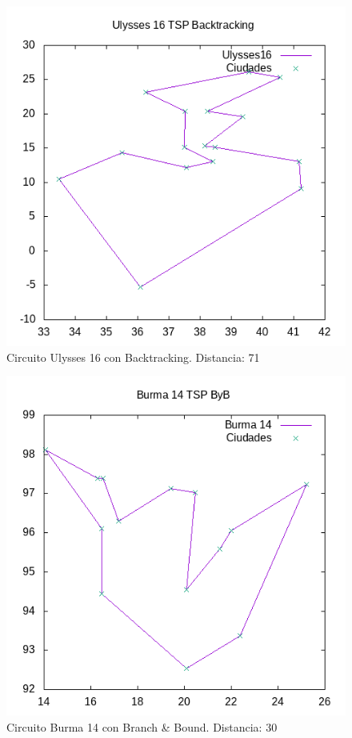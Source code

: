\documentclass{article}
\begin{document}
	\begin{figure}[H]
		\centering
		\includegraphics[totalheight=6cm]{ulysses16back}
		\caption{Circuito Ulysses 16 con Backtracking. Distancia: 71}
		\label{fig:u16back}
	\end{figure}

	\begin{figure}[H]
		\centering
		\includegraphics[totalheight=6cm]{burma14byb}
		\caption{Circuito Burma 14 con Branch \& Bound. Distancia: 30}
		\label{fig:b14byb}
	\end{figure}
\end{document}
